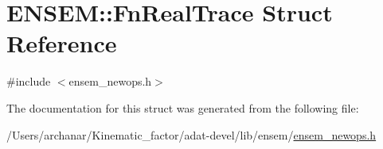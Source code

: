 \hypertarget{structENSEM_1_1FnRealTrace}{}\section{E\+N\+S\+EM\+:\+:Fn\+Real\+Trace Struct Reference}
\label{structENSEM_1_1FnRealTrace}


{\ttfamily \#include $<$ensem\+\_\+newops.\+h$>$}



The documentation for this struct was generated from the following file\+:\begin{DoxyCompactItemize}
\item 
/\+Users/archanar/\+Kinematic\+\_\+factor/adat-\/devel/lib/ensem/\mbox{\hyperlink{adat-devel_2lib_2ensem_2ensem__newops_8h}{ensem\+\_\+newops.\+h}}\end{DoxyCompactItemize}
